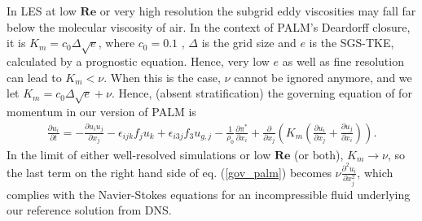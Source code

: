 \documentclass[a4paper,11pt]{article}
\newcommand{\RE}{\mathbf{Re}}
\begin{document}
In LES at low $\RE$ or very high resolution the subgrid eddy viscosities may fall far below the molecular viscosity of air. In the context of PALM's Deardorff closure, it is $K_m = c_0 \Delta \sqrt{e}$, where $c_0 = 0.1$ \citep{deardorff1980stratocumulus}, $\Delta$ is the grid size and $e$ is the SGS-TKE, calculated by a prognostic equation. Hence, very low $e$ as well as fine resolution can lead to $K_m<\nu$. When this is the case, $\nu$ cannot be ignored anymore, and we let $K_m = c_0 \Delta \sqrt{e} + \nu$. Hence, (absent stratification) the governing equation of for momentum in our version of PALM is
\begin{align}\label{gov_palm}
  \frac{\partial u_i}{\partial t} = - \frac{\partial u_i u_j}{\partial x_j} -\epsilon_{ijk}f_ju_k + \epsilon_{i3j} f_3 u_{g,j} - \frac{1}{\rho_0}\frac{\partial\pi^*}{\partial x_i} + \frac{\partial}{\partial x_j}\left( K_m\left(\frac{\partial u_i}{\partial x_j} + \frac{\partial u_j}{\partial x_i} \right)\right).
\end{align}
In the limit of either well-resolved simulations or low $\RE$ (or both), $K_m \rightarrow \nu$, so the last term on the right hand side of eq. (\ref{gov_palm}) becomes $\nu\frac{\partial^2u_i}{\partial x_j^2}$, which complies with the Navier-Stokes equations for an incompressible fluid underlying our reference solution from DNS.

\label{low-bound}
\end{document}
